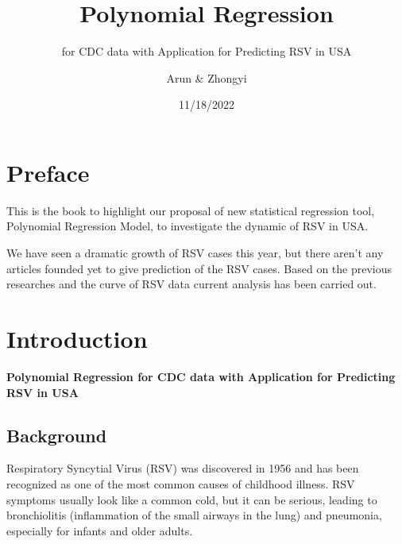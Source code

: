 \documentclass[
  letterpaper,
  DIV=11,
  numbers=noendperiod]{scrreport}
\title{Polynomial Regression}
\subtitle{for CDC data with Application for Predicting RSV in USA}
\author{Arun \& Zhongyi}
\date{11/18/2022}
\renewcommand*\contentsname{Table of contents}
\newcommand\contentsname{Table of contents}
\begin{document}
\maketitle
\ifdefined\Shaded\renewenvironment{Shaded}{\begin{tcolorbox}[enhanced, breakable, frame hidden, boxrule=0pt, borderline west={3pt}{0pt}{shadecolor}, interior hidden, sharp corners]}{\end{tcolorbox}}\fi

\renewcommand*\contentsname{Table of contents}
{
\hypersetup{linkcolor=}
\setcounter{tocdepth}{2}
\tableofcontents
}

\hypertarget{preface}{%
\chapter*{Preface}\label{preface}}

This is the book to highlight our proposal of new statistical regression
tool, Polynomial Regression Model, to investigate the dynamic of RSV in
USA.

We have seen a dramatic growth of RSV cases this year, but there aren't
any articles founded yet to give prediction of the RSV cases. Based on
the previous researches and the curve of RSV data current analysis has
been carried out.


\hypertarget{introduction}{%
\chapter{Introduction}\label{introduction}}

\textbf{Polynomial Regression for CDC data with Application for
Predicting RSV in USA}

\hypertarget{background}{%
\section{Background}\label{background}}

Respiratory Syncytial Virus (RSV) was discovered in 1956 and has been
recognized as one of the most common causes of childhood illness. RSV
symptoms usually look like a common cold, but it can be serious, leading
to bronchiolitis (inflammation of the small airways in the lung) and
pneumonia, especially for infants and older adults.
\end{document}
